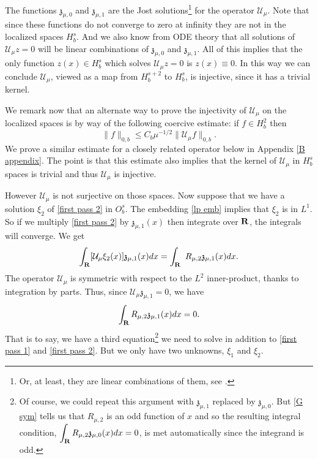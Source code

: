 \documentclass[12pt]{amsart}
\numberwithin{equation}{section}
\newcommand{\ds}{\displaystyle}
\newcommand{\be}{\begin{equation}}
\newcommand{\ee}{\end{equation}}
\newcommand{\R}{{\bf{R}}}
\newcommand{\muz}{{\mu,0}}
\newcommand{\muo}{{\mu,1}}
\newcommand{\U}{{\mathcal{U}}}
\begin{document}
The functions $\mathfrak{z}_\muz$ and $\mathfrak{z}_\muo$ are  the Jost solutions\footnote{Or, at least, they are linear combinations of them, see \cite{reed-simon3}.} for the operator  $\U_\mu$. Note that since these functions do not converge to zero
at infinity they are not in the localized spaces $H^s_b$. And we also know from ODE theory that all solutions of $\U_\mu z = 0$
will be linear combinations of $\mathfrak{z}_\muz$ and $\mathfrak{z}_\muo$. All of this implies that the only function $z(x) \in H^s_b$ which solves $\U_\mu z = 0$ is $z(x) \equiv 0$. In this way we can conclude $\U_\mu$, viewed as a map from $H^{s+2}_b$ to $H^s_b$, is injective, since it has a trivial kernel. 

We remark now that an alternate way to prove
the injectivity of $\U_\mu$ on the localized spaces is by way of the following coercive estimate: if $f \in H^{2}_b$
then
\be\label{U coerce}
\| f\|_{0,b} \le C_b \mu^{-1/2}\|\U_\mu f\|_{0,b}.
\ee
We prove a similar estimate for a closely related operator below in Appendix \ref{B appendix}.
 The point is that this estimate also implies 
that the kernel of $\U_\mu$ in $H^s_b$ spaces is trivial and thus $\U_\mu$ is injective.


However $\U_\mu$ is not surjective on those spaces.
Now suppose that we have
a solution $\xi_2$ of \eqref{first pass 2} in $O^s_b$. The embedding \eqref{lp emb} implies that $\xi_2$ is in $L^1$.
So if we multiply \eqref{first pass 2} by ${\mathfrak{z}}_\muo(x)$ then integrate over $\R$, the integrals will converge. We get
$$
\int_\R [\U_\mu \xi_2(x)] {\mathfrak{z}}_\muo(x) dx = \int_\R \ R_{\mu,2} {\mathfrak{z}}_\muo(x)dx.
$$
The operator $\U_\mu$ is symmetric with respect to the $L^2$ inner-product, thanks to integration by parts. Thus, since $\U_\mu {\mathfrak{z}}_\muo =0$, we have
\be\label{NC}
\int_\R R_{\mu,2} {\mathfrak{z}}_\muo(x) dx = 0.
\ee
That is to say, we have a third equation\footnote{Of course, we could repeat 
this argument with $\mathfrak{z}_\muo$ replaced by $\mathfrak{z}_\muz$. But \eqref{G sym}
tells us that $R_{\mu,2}$ is an odd function of $x$ and so  the resulting integral condition,
$\ds \int_\R R_{\mu,2} {\mathfrak{z}}_\muz(x) dx = 0$,  is met automatically since the integrand is odd.} we need to solve in addition to \eqref{first pass 1} and \eqref{first pass 2}.
But we only have two unknowns, $\xi_1$ and $\xi_2$. 
\end{document}
